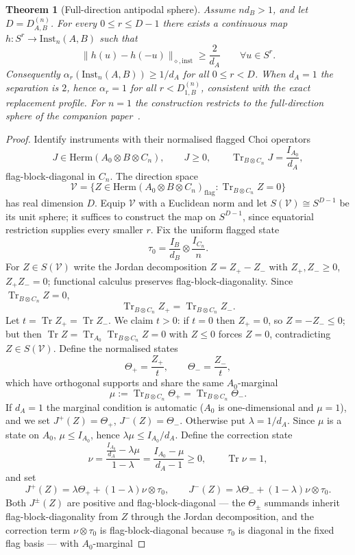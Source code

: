 \documentclass[11pt,a4paper]{article}
\newtheorem{theorem}{Theorem}[section]
\newcommand{\Herm}{\mathrm{Herm}}
\newcommand{\Inst}{\mathrm{Inst}}
\newcommand{\Tr}{\operatorname{Tr}}
\begin{document}
\begin{theorem}[Full-direction antipodal sphere]
\label{thm:full-direction}
Assume $nd_B>1$, and let $D=D_{A,B}^{(n)}$. For every $0\le r\le D-1$ there exists a continuous map $h:S^r\to\Inst_n(A,B)$ such that
\[
\|h(u)-h(-u)\|_{\diamond,\mathrm{inst}}\ge\frac2{d_A}
\qquad\forall u\in S^r.
\]
Consequently $\alpha_r(\Inst_n(A,B))\ge1/d_A$ for all $0\le r<D$. When $d_A=1$ the separation is $2$, hence $\alpha_r=1$ for all $r<D_{1,B}^{(n)}$, consistent with the exact replacement profile. For $n=1$ the construction restricts to the full-direction sphere of the companion paper~\cite{CompanionChannels}.
\end{theorem}

\begin{proof}
Identify instruments with their normalised flagged Choi operators
\[
J\in\Herm(A_0\otimes B\otimes C_n),\qquad J\ge0,\qquad
\Tr_{B\otimes C_n}J=\frac{I_{A_0}}{d_A},
\]
flag-block-diagonal in $C_n$. The direction space
\[
\mathcal V=\big\{Z\in\Herm(A_0\otimes B\otimes C_n)_{\mathrm{flag}}:\Tr_{B\otimes C_n}Z=0\big\}
\]
has real dimension $D$. Equip $\mathcal V$ with a Euclidean norm and let $S(\mathcal V)\cong S^{D-1}$ be its unit sphere; it suffices to construct the map on $S^{D-1}$, since equatorial restriction supplies every smaller $r$. Fix the uniform flagged state
\[
\tau_0=\frac{I_B}{d_B}\otimes\frac{I_{C_n}}n.
\]
For $Z\in S(\mathcal V)$ write the Jordan decomposition $Z=Z_+-Z_-$ with $Z_+,Z_-\ge0$, $Z_+Z_-=0$; functional calculus preserves flag-block-diagonality. Since $\Tr_{B\otimes C_n}Z=0$,
\[
\Tr_{B\otimes C_n}Z_+=\Tr_{B\otimes C_n}Z_-.
\]
Let $t=\Tr Z_+=\Tr Z_-$. We claim $t>0$: if $t=0$ then $Z_+=0$, so $Z=-Z_-\le0$; but then $\Tr Z=\Tr_{A_0}\Tr_{B\otimes C_n}Z=0$ with $Z\le0$ forces $Z=0$, contradicting $Z\in S(\mathcal V)$. Define the normalised states
\[
\Theta_+=\frac{Z_+}{t},\qquad \Theta_-=\frac{Z_-}{t},
\]
which have orthogonal supports and share the same $A_0$-marginal
\[
\mu:=\Tr_{B\otimes C_n}\Theta_+=\Tr_{B\otimes C_n}\Theta_-.
\]
If $d_A=1$ the marginal condition is automatic ($A_0$ is one-dimensional and $\mu=1$), and we set $J^+(Z)=\Theta_+$, $J^-(Z)=\Theta_-$. Otherwise put $\lambda=1/d_A$. Since $\mu$ is a state on $A_0$, $\mu\le I_{A_0}$, hence $\lambda\mu\le I_{A_0}/d_A$. Define the correction state
\[
\nu=\frac{\frac{I_{A_0}}{d_A}-\lambda\mu}{1-\lambda}
=\frac{I_{A_0}-\mu}{d_A-1}\ge0,
\qquad \Tr\nu=1,
\]
and set
\[
J^+(Z)=\lambda\Theta_++(1-\lambda)\nu\otimes\tau_0,\qquad
J^-(Z)=\lambda\Theta_-+(1-\lambda)\nu\otimes\tau_0.
\]
Both $J^\pm(Z)$ are positive and flag-block-diagonal --- the $\Theta_\pm$ summands inherit flag-block-diagonality from $Z$ through the Jordan decomposition, and the correction term $\nu\otimes\tau_0$ is flag-block-diagonal because $\tau_0$ is diagonal in the fixed flag basis --- with $A_0$-marginal

\end{proof}
\end{document}
